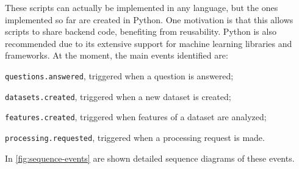 \documentclass[12pt,a4paper,openright,twoside]{book}
\begin{document}
These scripts can actually be implemented in any language, but the ones implemented so far are created in Python.
%
One motivation is that this allows scripts to share backend code, benefiting from reusability.
%
Python is also recommended due to its extensive support for machine learning libraries and frameworks.
%
At the moment, the main events identified are:
\begin{enumerate*}[label=(\roman*)]
    \item \texttt{questions.answered}, triggered when a question is answered;
    \item \texttt{datasets.created}, triggered when a new dataset is created;
    \item \texttt{features.created}, triggered when features of a dataset are analyzed;
    \item \texttt{processing.requested}, triggered when a processing request is made.
\end{enumerate*}

In \cref{fig:sequence-events} are shown detailed sequence diagrams of these events. 

\end{document}
